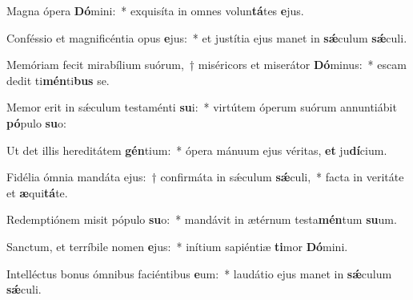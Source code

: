 \item Magna ópera \textbf{Dó}mini:~* exquisíta in omnes volun\textbf{tá}tes \textbf{e}jus.
\item Conféssio et magnificéntia opus \textbf{e}jus:~* et justítia ejus manet in \textbf{sǽ}culum \textbf{sǽ}culi.
\item Memóriam fecit mirabílium suórum,~† miséricors et miserátor \textbf{Dó}minus:~* escam dedit ti\textbf{mén}ti\textbf{bus} se.
\item Memor erit in sǽculum testaménti \textbf{su}i:~* virtútem óperum suórum annuntiábit \textbf{pó}pulo \textbf{su}o:
\item Ut det illis hereditátem \textbf{gén}tium:~* ópera mánuum ejus véritas, \textbf{et} ju\textbf{dí}cium.
\item Fidélia ómnia mandáta ejus:~† confirmáta in sǽculum \textbf{sǽ}culi,~* facta in veritáte et \textbf{æ}qui\textbf{tá}te.
\item Redemptiónem misit pópulo \textbf{su}o:~* mandávit in ætérnum testa\textbf{mén}tum \textbf{su}um.
\item Sanctum, et terríbile nomen \textbf{e}jus:~* inítium sapiéntiæ \textbf{ti}mor \textbf{Dó}mini.
\item Intelléctus bonus ómnibus faciéntibus \textbf{e}um:~* laudátio ejus manet in \textbf{sǽ}culum \textbf{sǽ}culi.
